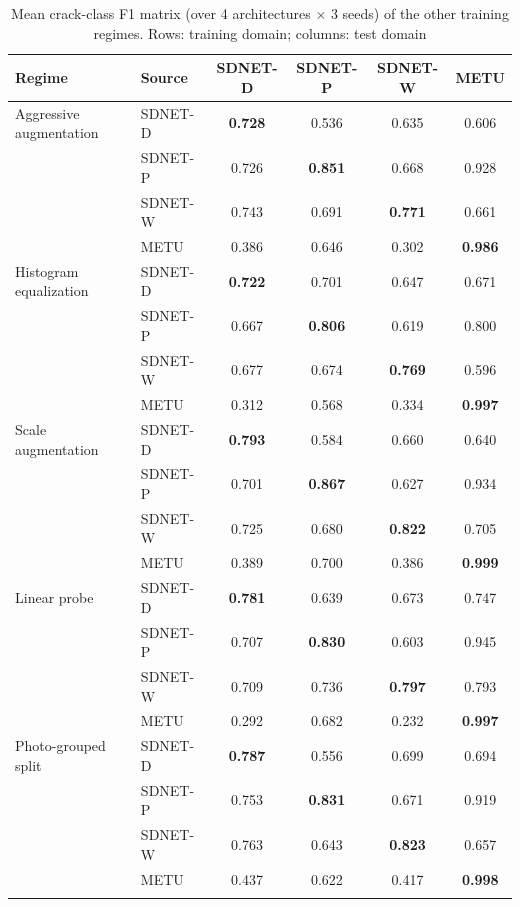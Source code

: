 \begin{table}[t]
\caption{Mean crack-class F1 matrix (over 4 architectures $\times$ 3 seeds) of the other training regimes. Rows: training domain; columns: test domain}\label{tab:A-regimes}
\begin{tabular*}{\textwidth}{@{\extracolsep\fill}llcccc@{}}
\toprule
Regime & Source & SDNET-D & SDNET-P & SDNET-W & METU \\
\midrule
Aggressive augmentation & SDNET-D & \textbf{0.728} & 0.536 & 0.635 & 0.606 \\
 & SDNET-P & 0.726 & \textbf{0.851} & 0.668 & 0.928 \\
 & SDNET-W & 0.743 & 0.691 & \textbf{0.771} & 0.661 \\
 & METU & 0.386 & 0.646 & 0.302 & \textbf{0.986} \\
\midrule
Histogram equalization & SDNET-D & \textbf{0.722} & 0.701 & 0.647 & 0.671 \\
 & SDNET-P & 0.667 & \textbf{0.806} & 0.619 & 0.800 \\
 & SDNET-W & 0.677 & 0.674 & \textbf{0.769} & 0.596 \\
 & METU & 0.312 & 0.568 & 0.334 & \textbf{0.997} \\
\midrule
Scale augmentation & SDNET-D & \textbf{0.793} & 0.584 & 0.660 & 0.640 \\
 & SDNET-P & 0.701 & \textbf{0.867} & 0.627 & 0.934 \\
 & SDNET-W & 0.725 & 0.680 & \textbf{0.822} & 0.705 \\
 & METU & 0.389 & 0.700 & 0.386 & \textbf{0.999} \\
\midrule
Linear probe & SDNET-D & \textbf{0.781} & 0.639 & 0.673 & 0.747 \\
 & SDNET-P & 0.707 & \textbf{0.830} & 0.603 & 0.945 \\
 & SDNET-W & 0.709 & 0.736 & \textbf{0.797} & 0.793 \\
 & METU & 0.292 & 0.682 & 0.232 & \textbf{0.997} \\
\midrule
Photo-grouped split & SDNET-D & \textbf{0.787} & 0.556 & 0.699 & 0.694 \\
 & SDNET-P & 0.753 & \textbf{0.831} & 0.671 & 0.919 \\
 & SDNET-W & 0.763 & 0.643 & \textbf{0.823} & 0.657 \\
 & METU & 0.437 & 0.622 & 0.417 & \textbf{0.998} \\
\botrule
\end{tabular*}
\end{table}

